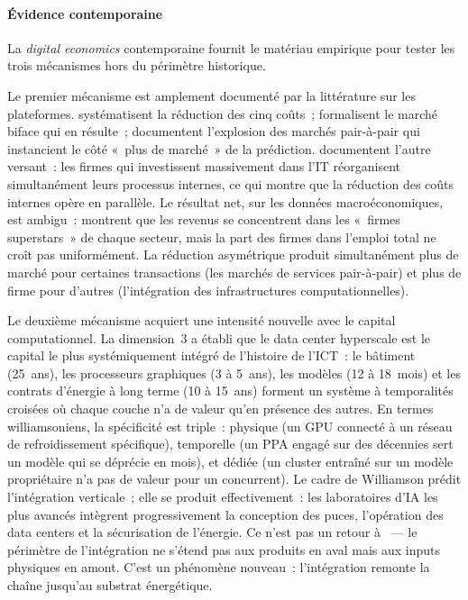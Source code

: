 \paragraph{Évidence contemporaine}

La \emph{digital economics} contemporaine fournit le matériau empirique pour tester les trois mécanismes hors du périmètre historique.

Le premier mécanisme est amplement documenté par la littérature sur les plateformes. \textcite{goldfarb_digital_2019} systématisent la réduction des cinq coûts~; \textcite{rochet_platform_2003} formalisent le marché biface qui en résulte~; \textcite{einav_peer_2016} documentent l'explosion des marchés pair-à-pair qui instancient le côté «~plus de marché~» de la prédiction. \textcite{brynjolfsson_hitt_2000} documentent l'autre versant~: les firmes qui investissent massivement dans l'IT réorganisent simultanément leurs processus internes, ce qui montre que la réduction des coûts internes opère en parallèle. Le résultat net, sur les données macroéconomiques, est ambigu~: \textcite{autor_fall_2020} montrent que les revenus se concentrent dans les «~firmes superstars~» de chaque secteur, mais la part des firmes dans l'emploi total ne croît pas uniformément. La réduction asymétrique produit simultanément plus de marché pour certaines transactions (les marchés de services pair-à-pair) et plus de firme pour d'autres (l'intégration des infrastructures computationnelles).

Le deuxième mécanisme acquiert une intensité nouvelle avec le capital computationnel. La dimension~3 a établi que le data center hyperscale est le capital le plus systémiquement intégré de l'histoire de l'ICT~: le bâtiment (25~ans), les processeurs graphiques (3 à 5~ans), les modèles (12 à 18~mois) et les contrats d'énergie à long terme (10 à 15~ans) forment un système à temporalités croisées où chaque couche n'a de valeur qu'en présence des autres. En termes williamsoniens, la spécificité est triple~: physique (un GPU connecté à un réseau de refroidissement spécifique), temporelle (un PPA engagé sur des décennies sert un modèle qui se déprécie en mois), et dédiée (un cluster entraîné sur un modèle propriétaire n'a pas de valeur pour un concurrent). Le cadre de Williamson prédit l'intégration verticale~; elle se produit effectivement~: les laboratoires d'IA les plus avancés intègrent progressivement la conception des puces, l'opération des data centers et la sécurisation de l'énergie. Ce n'est pas un retour à \textcite{chandler_visible_1977}~--- le périmètre de l'intégration ne s'étend pas aux produits en aval mais aux inputs physiques en amont. C'est un phénomène nouveau~: l'intégration remonte la chaîne jusqu'au substrat énergétique.

